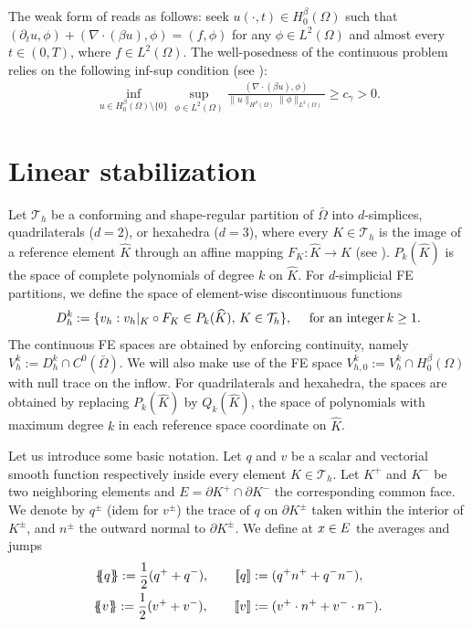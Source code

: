 The weak form of  reads as follows: seek $u(\cdot,t) \in H_0^\beta(\Omega)$ such that $(\partial_t u,\phi) +   (\nabla \cdot (\beta u),\phi) = (f,\phi)$ for any $\phi \in L^2(\Omega)$ and almost every $t \in (0,T)$, where  $f \in L^2(\Omega)$. The well-posedness of the continuous problem relies on the following inf-sup condition (see \cite{guermond_stabilization_1999}):
\begin{align}\label{eq-infsup}
\inf_{u \in H_0^\beta (\Omega)\setminus\{0\}} \sup_{\phi \in L^2(\Omega)} \frac{(\nabla \cdot (\beta u),\phi) }{\|u\|_{H^\beta (\Omega)} \|\phi\|_{L^2(\Omega)}} \geq c_{\gamma} > 0.
\end{align}

\section{Linear stabilization}\label{s-fem}
%
Let $\mathcal{T}_h$ be a conforming and shape-regular partition of $\bar \Omega$ into $d$-simplices, quadrilaterals ($d=2$), or hexahedra ($d=3$), where every $K \in \mathcal{T}_h$ is the image of a reference element $\widehat{K}$ through an affine mapping $F_K: \widehat K \rightarrow K$ (see \cite[Chp. 2]{ciarlet_finite_2002}). %
$P_k(\widehat K)$ is the space of complete polynomials of degree $k$ on $\widehat K$. For $d$-simplicial FE partitions, we define the space of element-wise discontinuous functions
$$
D_{h}^k := \{ v_h: v_h|_K \circ F_K \in P_k(\widehat K), \,{K} \in \mathcal{T}_h\}, \quad \hbox{ for an integer}\, k\geq 1. 
$$
The continuous FE spaces are obtained by enforcing continuity, namely $V_h^k := D_h^k \cap C^0(\bar \Omega)$. We will also make use of the FE space  $V^k_{h,0} := V^k_h \cap H_0^\beta(\Omega)$ with null trace on the inflow. For quadrilaterals and hexahedra, the spaces are obtained by replacing $P_k(\widehat K)$ by $Q_k(\widehat K)$, the space of polynomials with maximum degree $k$ in each reference space coordinate on $\widehat K$.  

Let us introduce some basic notation. Let  $q$ and $v$  be a scalar and vectorial smooth function respectively inside every element $K \in \mathcal{T}_h$. Let $K^+$ and $K^-$ be two neighboring elements and $E = \partial K^+ \cap \partial K^-$ the corresponding common face. We denote by $q^\pm$ (idem for $v^\pm$) the trace of $q$ on $\partial K^\pm$ taken within the interior of $K^\pm$, and $n^\pm$ the outward normal to $\partial K^\pm$. We define at $x \in E$ the averages and jumps 
\begin{align*}
\mean{q} := \half(q^+ + q^-),\qquad \jump{q} &:=(q^+  n^+ + q^- n^-),\\
\mean{v} := \half(v^+ + v^-) ,\qquad \jump{v} &:= (v^+ \cdot n^+ + v^- \cdot n^-).
\end{align*}


